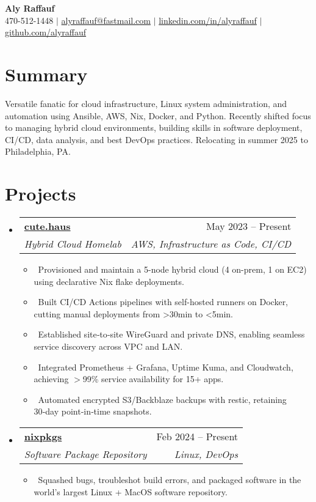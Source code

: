\documentclass[letterpaper,10pt]{article}
\makeatletter
\newcommand{\resumeItem}[1]{
\item\small{#1}}
\newcommand{\resumeSubheading}[4]{
  \vspace{-1pt}
\item
  \begin{tabular*}{0.97\textwidth}[t]{l@{\extracolsep{\fill}}r}
    \textbf{#1} & #2 \\
    \textit{#3} & \textit{#4} \\
  \end{tabular*}\vspace{-7pt}
}
\newcommand{\resumeSubHeadingList}{
\begin{itemize}[leftmargin=0.15in, label={}]}
\newcommand{\resumeSubHeadingListEnd}{
  \end{itemize}}
\makeatother
\begin{document}
\begin{center}
  \textbf{\Huge Aly Raffauf} \\
  \small 470-512-1448 $|$
  \href{mailto:alyraffauf@fastmail.com}{alyraffauf@fastmail.com} $|$
  \href{https://linkedin.com/in/alyraffauf}{linkedin.com/in/alyraffauf} $|$
  \href{https://github.com/alyraffauf}{github.com/alyraffauf}
\end{center}

\section{Summary}
Versatile fanatic for cloud infrastructure, Linux system
administration, and automation using Ansible, AWS, Nix, Docker, and
Python. Recently shifted focus to managing hybrid cloud environments,
building skills in software deployment, CI/CD, data analysis, and
best DevOps practices. Relocating in summer 2025 to Philadelphia, PA.

\section{Projects}
\resumeSubHeadingList
\resumeSubheading
{\href{https://cute.haus}{cute.haus}}{May 2023 -- Present}
{Hybrid Cloud Homelab}{AWS, Infrastructure as Code, CI/CD}
\resumeSubHeadingList
\resumeItem{\textbullet\ Provisioned and maintain a 5-node hybrid
cloud (4 on-prem, 1 on EC2) using declarative Nix flake deployments.}
\resumeItem{\textbullet\ Built CI/CD Actions pipelines with
self-hosted runners on Docker, cutting manual deployments from >30min to <5min.}
\resumeItem{\textbullet\ Established site‑to‑site WireGuard and
private DNS, enabling seamless service discovery across VPC and LAN.}
\resumeItem{\textbullet\ Integrated Prometheus + Grafana, Uptime
Kuma, and Cloudwatch, achieving $>$99\% service availability for 15+ apps.}
\resumeItem{\textbullet\ Automated encrypted S3/Backblaze backups
with restic, retaining 30‑day point‑in‑time snapshots.}
\resumeSubHeadingListEnd
\resumeSubheading
{\href{https://github.com/NixOS/nixpkgs}{nixpkgs}}{Feb 2024 -- Present}
{Software Package Repository}{Linux, DevOps}
\resumeSubHeadingList
\resumeItem{\textbullet\ Squashed bugs, troubleshot build errors, and
packaged software in the world's largest Linux + MacOS software repository.}
\resumeSubHeadingListEnd
\resumeSubHeadingListEnd
\end{document}
